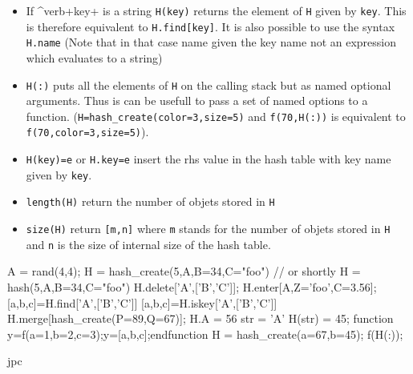\begin{itemize}
\item If ^verb+key+ is a string \verb+H(key)+ returns the element of \verb+H+ given by \verb+key+. 
  This is therefore equivalent to \verb+H.find[key]+. It is also possible to use 
  the syntax \verb+H.name+ (Note that in that case name given the key name not an expression 
  which evaluates to a string) 
\item \verb+H(:)+ puts all the elements of \verb+H+ on the calling stack but as named 
  optional arguments. Thus is can be usefull to pass a set of named options to a function. 
  (\verb+H=hash_create(color=3,size=5)+ and \verb+f(70,H(:))+ is equivalent to 
  \verb+f(70,color=3,size=5)+).
\item \verb+H(key)=e+ or \verb+H.key=e+ insert the rhs value in the hash table with key name 
  given by \verb+key+.
\end{itemize}

\begin{itemize}
   \item \verb+length(H)+ return the number of objets stored in \verb+H+
   \item \verb+size(H)+ return \verb+[m,n]+ where \verb+m+ stands for the number 
     of objets stored in \verb+H+ and \verb+n+ is the size of internal size of 
     the hash table. 
\end{itemize}

\begin{examples}
  \begin{program}
    A = rand(4,4);
    H = hash_create(5,A,B=34,C="foo")  // or shortly H = hash(5,A,B=34,C="foo")
    H.delete['A',['B','C']];
    H.enter[A,Z='foo',C=3.56];
    [a,b,c]=H.find['A',['B','C']]
    [a,b,c]=H.iskey['A',['B','C']]
    H.merge[hash_create(P=89,Q=67)];
    H.A = 56 
    str = 'A'
    H(str) = 45;
    function y=f(a=1,b=2,c=3);y=[a,b,c];endfunction 
    H = hash_create(a=67,b=45);
    f(H(:));
  \end{program}
 \end{examples}

\begin{authors}
  jpc
\end{authors}
